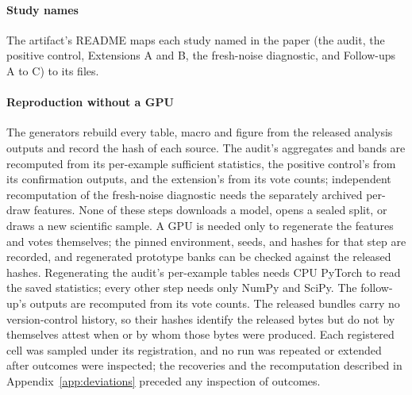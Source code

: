 \paragraph{Study names}
The artifact's README maps each study named in the paper (the audit, the
positive control, Extensions A and B, the fresh-noise diagnostic, and
Follow-ups A to C) to its files.

\paragraph{Reproduction without a GPU}
The generators rebuild every table, macro and figure from the released
analysis outputs and record the hash of each source. The audit's aggregates
and bands are recomputed from its per-example sufficient statistics, the
positive control's from its confirmation outputs, and the extension's from its
vote counts; independent recomputation of the fresh-noise diagnostic needs the
separately archived per-draw features. None of these steps downloads a model,
opens a sealed split, or draws a new scientific sample. A GPU is needed only
to regenerate the features and votes themselves; the pinned environment,
seeds, and hashes for that step are recorded, and regenerated prototype banks
can be checked against the released hashes. Regenerating the audit's
per-example tables needs CPU PyTorch to read the saved statistics; every other
step needs only NumPy and SciPy. The follow-up's outputs are recomputed from
its vote counts. The released bundles carry no version-control history, so
their hashes identify the released bytes but do not by themselves attest when
or by whom those bytes were produced. Each registered cell was sampled under
its registration, and no run was repeated or extended after outcomes were
inspected; the recoveries and the recomputation described in
Appendix~\ref{app:deviations} preceded any inspection of outcomes.
